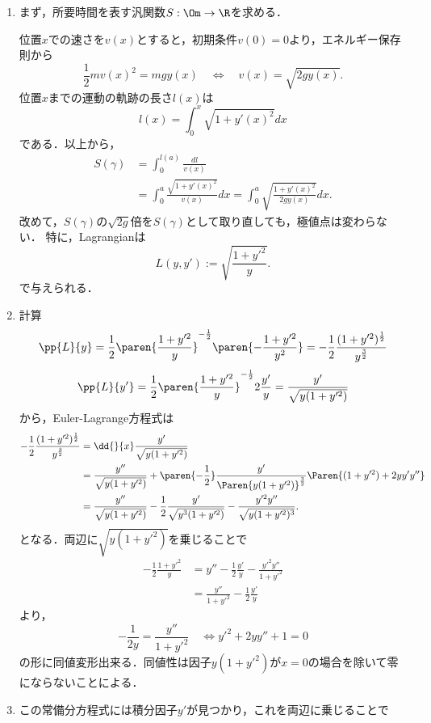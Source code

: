 \documentclass[uplatex,dvipdfmx]{jsreport}
\begin{document}
\begin{Proof}\mbox{}
    \begin{enumerate}[{Step}1]
        \item まず，所要時間を表す汎関数$S:\Om\to\R$を求める．
        
        位置$x$での速さを$v(x)$とすると，初期条件$v(0)=0$より，エネルギー保存則から
        \[\frac{1}{2}mv(x)^2=mgy(x)\quad\Leftrightarrow\quad v(x)=\sqrt{2gy(x)}.\]
        位置$x$までの運動の軌跡の長さ$l(x)$は
        \[l(x)=\int^x_0\sqrt{1+y'(x)^2}dx\]
        である．以上から，
        \begin{align*}
            S(\gamma)&=\int^{l(a)}_0\frac{dl}{v(x)}\\
            &=\int^a_0\frac{\sqrt{1+y'(x)^2}}{v(x)}dx=\int^a_0\sqrt{\frac{1+y'(x)^2}{2gy(x)}}dx.
        \end{align*}
        改めて，$S(\gamma)$の$\sqrt{2g}$倍を$S(\gamma)$として取り直しても，極値点は変わらない．
        特に，Lagrangianは
        \[L(y,y'):=\sqrt{\frac{1+y'^2}{y}}.\]
        で与えられる．
        \item 計算
        \[\pp{L}{y}=\frac{1}{2}\paren{\frac{1+y'^2}{y}}^{-\frac{1}{2}}\paren{-\frac{1+y'^2}{y^2}}=-\frac{1}{2}\frac{(1+y'^2)^{\frac{1}{2}}}{y^{\frac{3}{2}}}\]
        \[\pp{L}{y'}=\frac{1}{2}\paren{\frac{1+y'^2}{y}}^{-\frac{1}{2}}2\frac{y'}{y}=\frac{y'}{\sqrt{y(1+y'^2)}}\]
        から，Euler-Lagrange方程式は
        \begin{align*}
            -\frac{1}{2}\frac{(1+y'^2)^{\frac{1}{2}}}{y^{\frac{3}{2}}}&=\dd{}{x}\frac{y'}{\sqrt{y(1+y'^2)}}\\
            &=\frac{y''}{\sqrt{y(1+y'^2)}}+\paren{-\frac{1}{2}}\frac{y'}{\Paren{y(1+y'^2)}^{\frac{3}{2}}}\Paren{(1+y'^2)+2yy'y''}\\
            &=\frac{y''}{\sqrt{y(1+y'^2)}}-\frac{1}{2}\frac{y'}{\sqrt{y^3(1+y'^2)}}-\frac{y'^2y''}{\sqrt{y(1+y'^2)^3}}.
        \end{align*}
        となる．両辺に$\sqrt{y(1+y'^2)}$を乗じることで
        \begin{align*}
            -\frac{1}{2}\frac{1+y'^2}{y}&=y''-\frac{1}{2}\frac{y'}{y}-\frac{y'^2y''}{1+y'^2}\\
            &=\frac{y''}{1+y'^2}-\frac{1}{2}\frac{y'}{y}
        \end{align*}
        より，
        \[-\frac{1}{2y}=\frac{y''}{1+y'^2}\quad\Leftrightarrow y'^2+2yy''+1=0\]
        の形に同値変形出来る．同値性は因子$y(1+y'^2)$が$x=0$の場合を除いて零にならないことによる．
        \item この常備分方程式には積分因子$y'$が見つかり，これを両辺に乗じることで

\end{enumerate}
\end{Proof}
\end{document}
